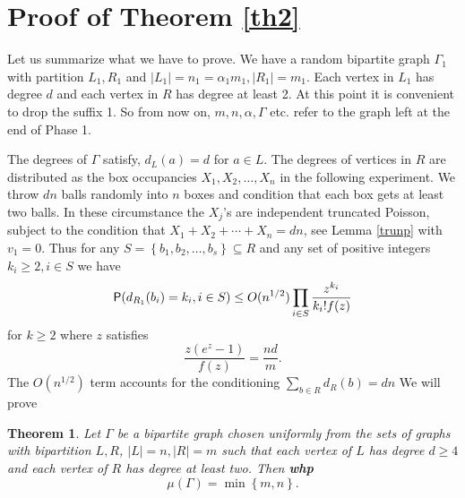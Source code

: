 \documentclass[11pt]{article}
\def\a{\alpha}
\def\G{\Gamma}
\def\m{\mu}
\def\whp{{\bf whp}}
\newcommand{\set}[1]{\left\{#1\right\}}
\def\Pr{{\sf P}}
\newtheorem{theorem}{Theorem}
\begin{document}
\section{Proof of Theorem \ref{th2}}\label{pot2}
Let us summarize what we have to prove.
We have a random bipartite graph $\G_1$ with partition $L_1,R_1$ and $|L_1|=n_1=\a_1 m_1,|R_1|=m_1$.
Each vertex in $L_1$ has degree $d$ and each vertex in $R$ has degree at least 2.
At this point it is convenient to drop the suffix 1. So from now on, $m,n,\a,\G$ etc. refer to the graph left at the end of Phase 1.

The degrees of $\G$ satisfy, $d_{L}(a)=d$ for $a\in L$. The degrees of vertices in $R$ are distributed as the 
box occupancies $X_1,X_2,\ldots,X_n$ in the following experiment. We throw $dn$ balls randomly into $n$ boxes and condition that 
each box gets
at least two balls.  In these circumstance the $X_j$'s are independent truncated Poisson, subject to the 
condition that $X_1+X_2+\cdots+X_n=dn$, see Lemma \ref{trunp} with $v_1=0$. 
Thus for any $S=\set{b_1,b_2,\ldots,b_s}\subseteq R$ and any set of positive integers $k_i\geq 2,i\in S$ we have 
$$\Pr(d_{R_1}(b_i)=k_i,i\in S)\leq O(n^{1/2})\prod_{i\in S}\frac{z^{k_i}}{k_i!f(z)}$$ 
for 
$k\geq 2$ where $z$ satisfies 
$$\frac{z(e^{z}-1)}{f(z)}=\frac{nd}{m}.$$
The $O(n^{1/2})$ term accounts for the conditioning $\sum_{b\in R}d_{R}(b)=dn$
We will prove
\begin{theorem}\label{min}
Let $\G$ be a bipartite graph chosen uniformly from the sets of graphs with bipartition $L,R$, $|L|=n,|R|=m$
such that each vertex of $L$ has degree $d\geq 4$ and each vertex of $R$ has degree at least two. Then \whp
$$\m(\G)=\min\set{m,n}.$$
\end{theorem}
\end{document}
